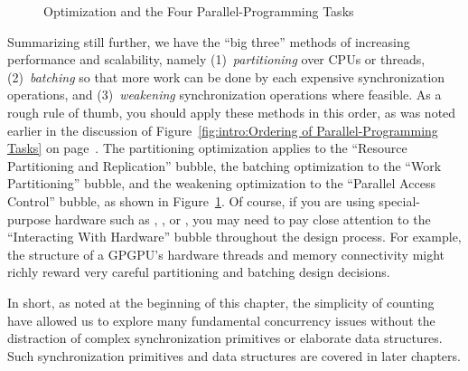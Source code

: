 \begin{figure}
\centering
{}
\caption{Optimization and the Four Parallel-Programming Tasks}
\label{fig:count:Optimization and the Four Parallel-Programming Tasks}
\end{figure}

Summarizing still further, we have the ``big three'' methods of
increasing performance and scalability, namely
(1)~\emph{partitioning} over CPUs or threads,
(2)~\emph{batching} so that more work can be done by each expensive
synchronization operations, and
(3)~\emph{weakening} synchronization operations where feasible.
As a rough rule of thumb, you should apply these methods in this order,
as was noted earlier in the discussion of
Figure~\ref{fig:intro:Ordering of Parallel-Programming Tasks}
on
page~\pageref{fig:intro:Ordering of Parallel-Programming Tasks}.
The partitioning optimization applies to the
``Resource Partitioning and Replication'' bubble,
the batching optimization to the ``Work Partitioning'' bubble,
and the weakening optimization to the ``Parallel Access Control'' bubble,
as shown in
Figure~\ref{fig:count:Optimization and the Four Parallel-Programming Tasks}.
Of course, if you are using special-purpose hardware such as
, , or , you may need
to pay close attention to the ``Interacting With Hardware'' bubble
throughout the design process.
For example, the structure of a GPGPU's hardware threads and memory
connectivity might richly reward very careful partitioning
and batching design decisions.

In short, as noted at the beginning of this chapter, the simplicity
of counting have allowed us to explore many
fundamental concurrency issues without the distraction of
complex synchronization primitives or elaborate data structures.
Such synchronization primitives and data structures are covered
in later chapters.


